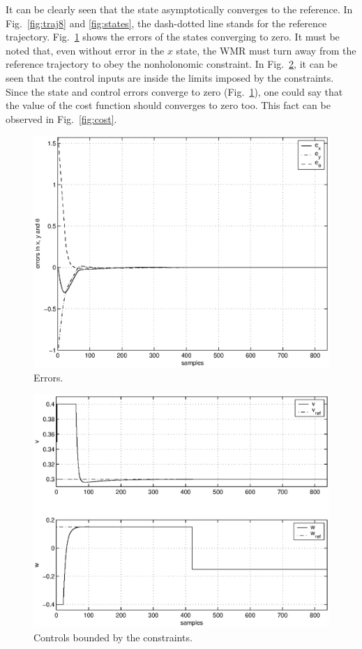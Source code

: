\documentclass[conference]{IEEEtran} %
\begin{document}
It can be clearly seen that the state asymptotically converges to the
reference. In Fig.~\ref{fig:traj8} and \ref{fig:states}, the dash-dotted
line stands for the reference trajectory.
Fig.~\ref{fig:errors} shows the errors of the states converging to zero. It
must be noted that, even without error in the $x$ state, the WMR must turn
away from the reference trajectory to obey the nonholonomic constraint. In
Fig.~\ref{fig:controls}, it can be seen that the control inputs are inside
the limits imposed by the constraints. Since the state and control errors
converge to zero (Fig.~\ref{fig:errors}), one could say that the value of
the cost function should converges to zero too. This fact can be observed in
Fig.~\ref{fig:cost}.

\begin{figure}[htbp]
	\centering
    \includegraphics[width=.95\linewidth]{Figures/errors.eps}
    \caption{Errors.}
    \label{fig:errors}
\end{figure}

\begin{figure}[htbp]
	\centering
    \includegraphics[width=.95\linewidth]{Figures/controls.eps}
    \caption{Controls bounded by the constraints.}
    \label{fig:controls}
\end{figure}
\end{document}
